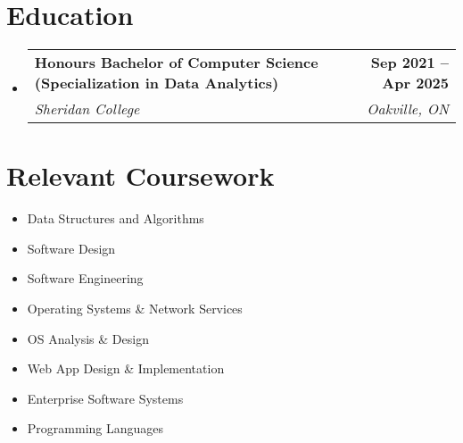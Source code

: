 \documentclass[a4,11pt]{article}
\makeatletter
\newcommand{\resumeSubheading}[4]{
  \vspace{-2pt}\item
    \begin{tabular*}{1.0\textwidth}[t]{l@{\extracolsep{\fill}}r}
      \textbf{#1} & \textbf{\small #2} \\
      \textit{\small#3} & \textit{\small #4} \\
    \end{tabular*}\vspace{-7pt}
}
\newcommand{\resumeSubHeadingListStart}{\begin{itemize}[leftmargin=0.0in, label={}]}
\newcommand{\resumeSubHeadingListEnd}{\end{itemize}}
\makeatother
\begin{document}
\section{Education}
  \resumeSubHeadingListStart
    \resumeSubheading
      {Honours Bachelor of Computer Science (Specialization in Data Analytics) }{Sep 2021 -- Apr 2025}
      {Sheridan College}{Oakville, ON}
  \resumeSubHeadingListEnd

\section{Relevant Coursework}
    \begin{multicols}{3}
        \begin{itemize}[itemsep=-2pt, parsep=3pt]
            \item\small Data Structures and Algorithms
            \item Software Design
            \item Software Engineering
            \item Operating Systems \& Network Services
            \item OS Analysis \& Design
            \item Web App Design \& Implementation
            \item Enterprise Software Systems
            \item Programming Languages
        \end{itemize}
    \end{multicols}
    \vspace*{2.0\multicolsep}

\end{document}
